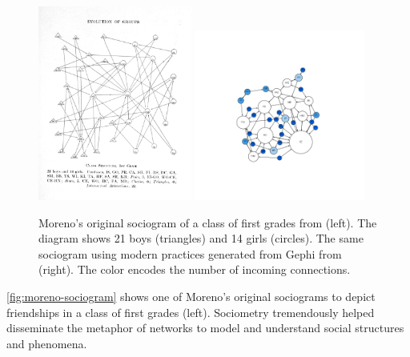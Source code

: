 \begin{figure}[!ht]
    \centering %
    \includegraphics[width=0.45\textwidth]{static/figures/RelatedWork/Moreno-1}
    \includegraphics[width=0.50\textwidth,trim={4cm 4cm 4cm 4cm},clip]{static/figures/RelatedWork/Moreno-1_GrandJean}
    \caption{Moreno's original sociogram of a class of first grades from \cite{morenoWhoShallSurvive1934} (left). The diagram shows 21 boys (triangles) and 14 girls (circles). The same sociogram using modern practices generated from Gephi from \cite{grandjeanSocialNetworkAnalysis2015} (right). The color encodes the number of incoming connections.}
    \label{fig:moreno-sociogram}
\end{figure}
\autoref{fig:moreno-sociogram} shows one of Moreno's original sociograms to depict friendships in a class of first grades (left).
Sociometry tremendously helped disseminate the metaphor of networks to model and understand social structures and phenomena.
